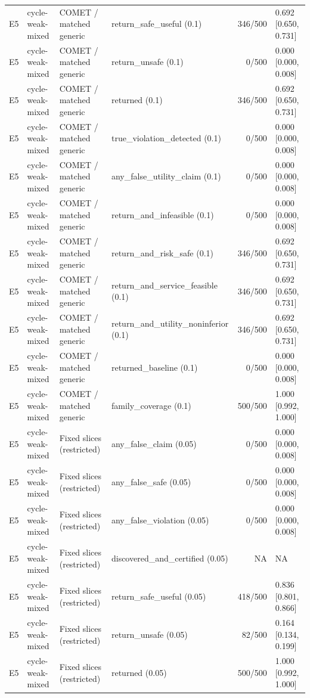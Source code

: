 \begin{longtable}{p{.04\linewidth}p{.18\linewidth}p{.19\linewidth}p{.16\linewidth}r p{.21\linewidth}}
E5 & cycle-weak-mixed & COMET / matched generic & return\_safe\_useful (0.1) & 346/500 & 0.692 [0.650, 0.731]\\
E5 & cycle-weak-mixed & COMET / matched generic & return\_unsafe (0.1) & 0/500 & 0.000 [0.000, 0.008]\\
E5 & cycle-weak-mixed & COMET / matched generic & returned (0.1) & 346/500 & 0.692 [0.650, 0.731]\\
E5 & cycle-weak-mixed & COMET / matched generic & true\_violation\_detected (0.1) & 0/500 & 0.000 [0.000, 0.008]\\
E5 & cycle-weak-mixed & COMET / matched generic & any\_false\_utility\_claim (0.1) & 0/500 & 0.000 [0.000, 0.008]\\
E5 & cycle-weak-mixed & COMET / matched generic & return\_and\_infeasible (0.1) & 0/500 & 0.000 [0.000, 0.008]\\
E5 & cycle-weak-mixed & COMET / matched generic & return\_and\_risk\_safe (0.1) & 346/500 & 0.692 [0.650, 0.731]\\
E5 & cycle-weak-mixed & COMET / matched generic & return\_and\_service\_feasible (0.1) & 346/500 & 0.692 [0.650, 0.731]\\
E5 & cycle-weak-mixed & COMET / matched generic & return\_and\_utility\_noninferior (0.1) & 346/500 & 0.692 [0.650, 0.731]\\
E5 & cycle-weak-mixed & COMET / matched generic & returned\_baseline (0.1) & 0/500 & 0.000 [0.000, 0.008]\\
E5 & cycle-weak-mixed & COMET / matched generic & family\_coverage (0.1) & 500/500 & 1.000 [0.992, 1.000]\\
E5 & cycle-weak-mixed & Fixed slices (restricted) & any\_false\_claim (0.05) & 0/500 & 0.000 [0.000, 0.008]\\
E5 & cycle-weak-mixed & Fixed slices (restricted) & any\_false\_safe (0.05) & 0/500 & 0.000 [0.000, 0.008]\\
E5 & cycle-weak-mixed & Fixed slices (restricted) & any\_false\_violation (0.05) & 0/500 & 0.000 [0.000, 0.008]\\
E5 & cycle-weak-mixed & Fixed slices (restricted) & discovered\_and\_certified (0.05) & NA & NA\\
E5 & cycle-weak-mixed & Fixed slices (restricted) & return\_safe\_useful (0.05) & 418/500 & 0.836 [0.801, 0.866]\\
E5 & cycle-weak-mixed & Fixed slices (restricted) & return\_unsafe (0.05) & 82/500 & 0.164 [0.134, 0.199]\\
E5 & cycle-weak-mixed & Fixed slices (restricted) & returned (0.05) & 500/500 & 1.000 [0.992, 1.000]\\

\end{longtable}
